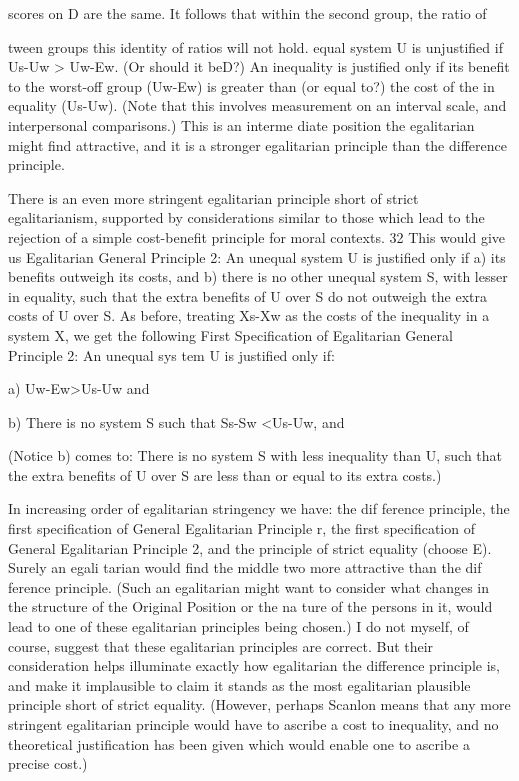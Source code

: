 \documentclass[11pt,openany]{book}
\begin{document}
scores on D are the same. It follows that within the second group, the ratio of 

tween groups this identity of ratios will not hold. equal system U is unjustified if Us-Uw > Uw-Ew. (Or should it beD?) An inequality is justified only if its benefit to the worst-off group (Uw-Ew) is greater than (or equal to?) the cost of the in equality (Us-Uw). (Note that this involves measurement on an interval scale, and interpersonal comparisons.) This is an interme diate position the egalitarian might find attractive, and it is a stronger egalitarian principle than the difference principle. 

There is an even more stringent egalitarian principle short of strict egalitarianism, supported by considerations similar to those which lead to the rejection of a simple cost-benefit principle for moral contexts. 32 This would give us Egalitarian General Principle 2: An unequal system U is justified only if a) its benefits outweigh its costs, and b) there is no other unequal system S, with lesser in equality, such that the extra benefits of U over S do not outweigh the extra costs of U over S. As before, treating Xs-Xw as the costs of the inequality in a system X, we get the following First Specification of Egalitarian General Principle 2: An unequal sys tem U is justified only if: 

a) Uw-Ew>Us-Uw and 

b) There is no system S such that Ss-Sw <Us-Uw, and 

(Notice b) comes to: There is no system S with less inequality than U, such that the extra benefits of U over S are less than or equal to its extra costs.) 

In increasing order of egalitarian stringency we have: the dif ference principle, the first specification of General Egalitarian Principle r, the first specification of General Egalitarian Principle 2, and the principle of strict equality (choose E). Surely an egali tarian would find the middle two more attractive than the dif ference principle. (Such an egalitarian might want to consider what changes in the structure of the Original Position or the na ture of the persons in it, would lead to one of these egalitarian principles being chosen.) I do not myself, of course, suggest that these egalitarian principles are correct. But their consideration helps illuminate exactly how egalitarian the difference principle is, and make it implausible to claim it stands as the most egalitarian plausible principle short of strict equality. (However, perhaps Scanlon means that any more stringent egalitarian principle would have to ascribe a cost to inequality, and no theoretical justification has been given which would enable one to ascribe a precise cost.) 
\end{document}
